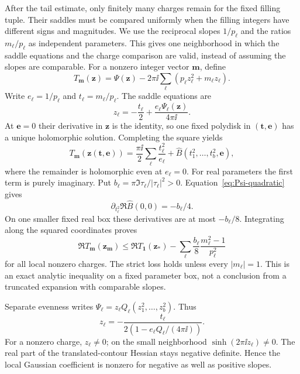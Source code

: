 After the tail estimate, only finitely many charges remain for the fixed filling tuple. Their saddles must be compared uniformly when the filling integers have different signs and magnitudes. We use the reciprocal slopes $1/p_\ell$ and the ratios $m_\ell/p_\ell$ as independent parameters. This gives one neighborhood in which the saddle equations and the charge comparison are valid, instead of assuming the slopes are comparable.
For a nonzero integer vector $\mathbf m$, define
\[
 T_{\mathbf m}(\mathbf z)=\Psi(\mathbf z)
 -2\pi\ii\sum_\ell(p_\ell z_\ell^2+m_\ell z_\ell).
\]
Write $e_\ell=1/p_\ell$ and $t_\ell=m_\ell/p_\ell$. The saddle equations are
\begin{equation}\label{eq:charge-saddle}
 z_\ell=-\frac{t_\ell}{2}
       +\frac{e_\ell\Psi_\ell(\mathbf z)}{4\pi\ii}.
\end{equation}
At $\mathbf e=0$ their derivative in $\mathbf z$ is the identity, so one fixed polydisk in $(\mathbf t,\mathbf e)$ has a unique holomorphic solution. Completing the square yields
\begin{equation}\label{eq:charge-square}
 T_{\mathbf m}(\mathbf z(\mathbf t,\mathbf e))
 =\frac{\pi\ii}{2}\sum_\ell\frac{t_\ell^2}{e_\ell}
 +\widehat B(t_1^2,\ldots,t_b^2,\mathbf e),
\end{equation}
where the remainder is holomorphic even at $e_\ell=0$. For real parameters the first term is purely imaginary. Put $b_\ell=\pi\Im\tau_\ell/|\tau_\ell|^2>0$. Equation~\eqref{eq:Psi-quadratic} gives
\[
 \partial_{t_\ell^2}\Re\widehat B(0,0)=-b_\ell/4.
\]
On one smaller fixed real box these derivatives are at most $-b_\ell/8$. Integrating along the squared coordinates proves
\begin{equation}\label{eq:charge-gap}
 \Re T_{\mathbf m}(\mathbf z_{\mathbf m})
 \le\Re T_{\mathbf1}(\mathbf z_*)
 -\sum_\ell\frac{b_\ell}{8}\frac{m_\ell^2-1}{p_\ell^2}
\end{equation}
for all local nonzero charges. The strict loss holds unless every $|m_\ell|=1$. This is an exact analytic inequality on a fixed parameter box, not a conclusion from a truncated expansion with comparable slopes.

Separate evenness writes $\Psi_\ell=z_\ell Q_\ell(z_1^2,\ldots,z_b^2)$. Thus
\[
 z_\ell=-\frac{t_\ell}{2(1-e_\ell Q_\ell/(4\pi\ii))}.
\]
For a nonzero charge, $z_\ell\ne0$; on the small neighborhood $\sinh(2\pi\ii z_\ell)\ne0$. The real part of the translated-contour Hessian stays negative definite. Hence the local Gaussian coefficient is nonzero for negative as well as positive slopes.

